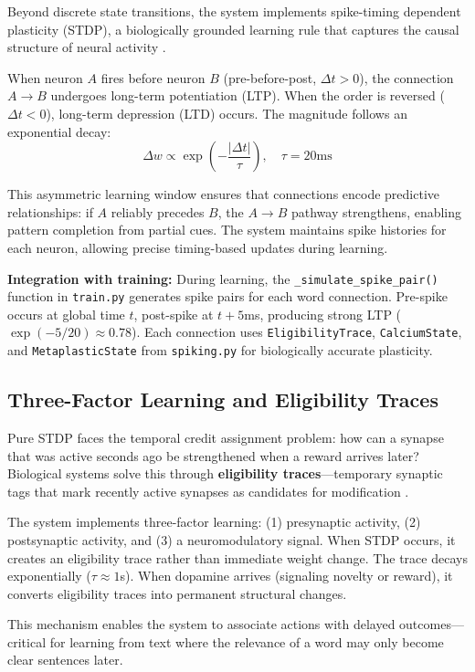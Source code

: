 \documentclass[11pt]{article}
\begin{document}
Beyond discrete state transitions, the system implements spike-timing dependent plasticity (STDP), a biologically grounded learning rule that captures the causal structure of neural activity \citep{markram1997regulation}.

When neuron $A$ fires before neuron $B$ (pre-before-post, $\Delta t > 0$), the connection $A \rightarrow B$ undergoes long-term potentiation (LTP). When the order is reversed ($\Delta t < 0$), long-term depression (LTD) occurs. The magnitude follows an exponential decay:
\[
\Delta w \propto \exp\left(-\frac{|\Delta t|}{\tau}\right), \quad \tau = 20\text{ms}
\]

This asymmetric learning window ensures that connections encode predictive relationships: if $A$ reliably precedes $B$, the $A \rightarrow B$ pathway strengthens, enabling pattern completion from partial cues. The system maintains spike histories for each neuron, allowing precise timing-based updates during learning.

\textbf{Integration with training:} During learning, the \texttt{\_simulate\_spike\_pair()} function in \texttt{train.py} generates spike pairs for each word connection. Pre-spike occurs at global time $t$, post-spike at $t + 5$ms, producing strong LTP ($\exp(-5/20) \approx 0.78$). Each connection uses \texttt{EligibilityTrace}, \texttt{CalciumState}, and \texttt{MetaplasticState} from \texttt{spiking.py} for biologically accurate plasticity.

\subsection{Three-Factor Learning and Eligibility Traces}

Pure STDP faces the temporal credit assignment problem: how can a synapse that was active seconds ago be strengthened when a reward arrives later? Biological systems solve this through \textbf{eligibility traces}---temporary synaptic tags that mark recently active synapses as candidates for modification \citep{gerstner2018eligibility}.

The system implements three-factor learning: (1) presynaptic activity, (2) postsynaptic activity, and (3) a neuromodulatory signal. When STDP occurs, it creates an eligibility trace rather than immediate weight change. The trace decays exponentially ($\tau \approx 1$s). When dopamine arrives (signaling novelty or reward), it converts eligibility traces into permanent structural changes.

This mechanism enables the system to associate actions with delayed outcomes---critical for learning from text where the relevance of a word may only become clear sentences later.
\end{document}
